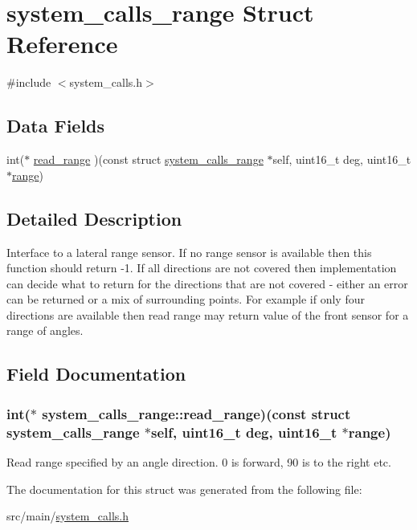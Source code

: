 \hypertarget{structsystem__calls__range}{\section{system\+\_\+calls\+\_\+range Struct Reference}
\label{structsystem__calls__range}
}


{\ttfamily \#include $<$system\+\_\+calls.\+h$>$}

\subsection*{Data Fields}
\begin{DoxyCompactItemize}
\item 
int($\ast$ \hyperlink{structsystem__calls__range_a0e09d6229856c77de785eea2df5a595d}{read\+\_\+range} )(const struct \hyperlink{structsystem__calls__range}{system\+\_\+calls\+\_\+range} $\ast$self, uint16\+\_\+t deg, uint16\+\_\+t $\ast$\hyperlink{config_2rx_8h_a53eac340462a61108eed07ba3e52e233}{range})
\end{DoxyCompactItemize}


\subsection{Detailed Description}
Interface to a lateral range sensor. If no range sensor is available then this function should return -\/1. If all directions are not covered then implementation can decide what to return for the directions that are not covered -\/ either an error can be returned or a mix of surrounding points. For example if only four directions are available then read range may return value of the front sensor for a range of angles. 

\subsection{Field Documentation}
\hypertarget{structsystem__calls__range_a0e09d6229856c77de785eea2df5a595d}{
\subsubsection[{read\+\_\+range}]{\setlength{\rightskip}{0pt plus 5cm}int($\ast$ system\+\_\+calls\+\_\+range\+::read\+\_\+range)(const struct {\bf system\+\_\+calls\+\_\+range} $\ast$self, uint16\+\_\+t deg, uint16\+\_\+t $\ast${\bf range})}}\label{structsystem__calls__range_a0e09d6229856c77de785eea2df5a595d}
Read range specified by an angle direction. 0 is forward, 90 is to the right etc. 

The documentation for this struct was generated from the following file\+:\begin{DoxyCompactItemize}
\item 
src/main/\hyperlink{system__calls_8h}{system\+\_\+calls.\+h}\end{DoxyCompactItemize}

